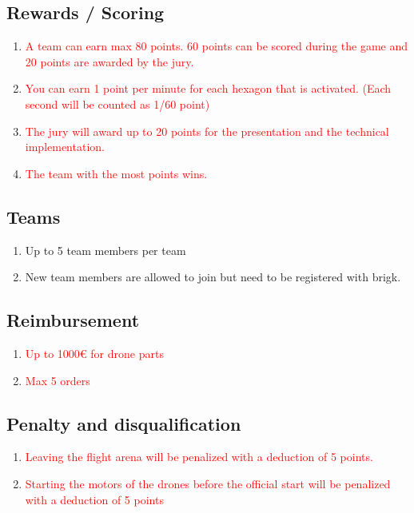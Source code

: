 \subsection{Rewards / Scoring}
\begin{enumerate}
	\item{\textcolor{red}{A team can earn max 80 points. 60 points can be scored during the game and 20 points are awarded by the jury.}}
	\item{\textcolor{red}{You can earn 1 point per minute for each hexagon that is activated. (Each second will be counted as 1/60 point)}}
	\item{\textcolor{red}{The jury will award up to 20 points for the presentation and the technical implementation.}}
	\item{\textcolor{red}{The team with the most points wins.}}
\end{enumerate}

\subsection{Teams}
\begin{enumerate}
	\item{Up to 5 team members per team}
	\item{New team members are allowed to join but need to be registered with brigk.}
\end{enumerate}

\subsection{Reimbursement}
\begin{enumerate}
	\item{\textcolor{red}{Up to 1000€ for drone parts}}
	\item{\textcolor{red}{Max 5 orders}}
\end{enumerate}

\subsection{Penalty and disqualification}
\begin{enumerate}
	\item{\textcolor{red}{Leaving the flight arena will be penalized with a deduction of 5 points.}}
	\item{\textcolor{red}{Starting the motors of the drones before the official start will be penalized with a deduction of 5 points }}
\end{enumerate}

